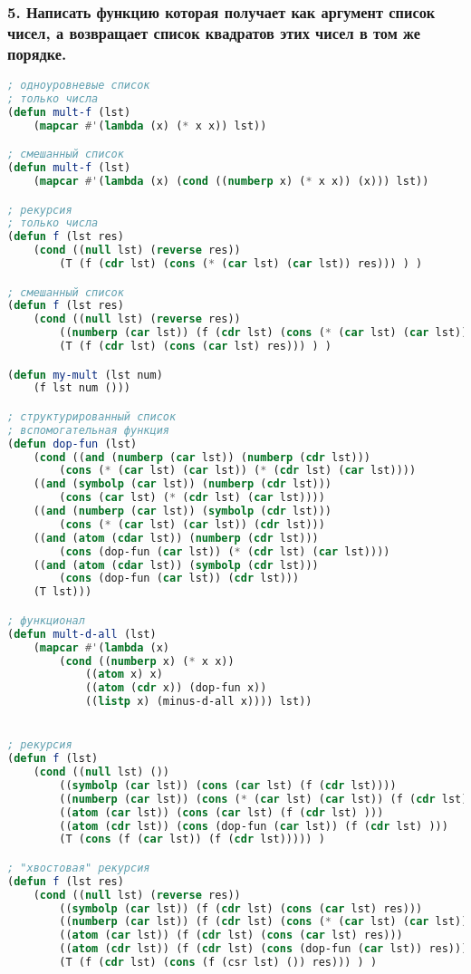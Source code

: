 \subsubsection*{5. Написать функцию которая получает как аргумент список чисел, а возвращает список квадратов этих чисел в том же порядке.}
\begin{lstlisting}[language=Lisp]
; одноуровневые список
; только числа
(defun mult-f (lst)
	(mapcar #'(lambda (x) (* x x)) lst))

; смешанный список
(defun mult-f (lst)
	(mapcar #'(lambda (x) (cond ((numberp x) (* x x)) (x))) lst))

; рекурсия
; только числа
(defun f (lst res)
	(cond ((null lst) (reverse res))
		(T (f (cdr lst) (cons (* (car lst) (car lst)) res))) ) )

; смешанный список
(defun f (lst res)
	(cond ((null lst) (reverse res))
		((numberp (car lst)) (f (cdr lst) (cons (* (car lst) (car lst)) res)))
		(T (f (cdr lst) (cons (car lst) res))) ) )

(defun my-mult (lst num)
	(f lst num ()))

; структурированный список
; вспомогательная функция
(defun dop-fun (lst)
	(cond ((and (numberp (car lst)) (numberp (cdr lst))) 
		(cons (* (car lst) (car lst)) (* (cdr lst) (car lst))))
	((and (symbolp (car lst)) (numberp (cdr lst))) 
		(cons (car lst) (* (cdr lst) (car lst))))
	((and (numberp (car lst)) (symbolp (cdr lst))) 
		(cons (* (car lst) (car lst)) (cdr lst)))
	((and (atom (cdar lst)) (numberp (cdr lst))) 
		(cons (dop-fun (car lst)) (* (cdr lst) (car lst))))
	((and (atom (cdar lst)) (symbolp (cdr lst))) 
		(cons (dop-fun (car lst)) (cdr lst)))
	(T lst)))

; функционал
(defun mult-d-all (lst)
	(mapcar #'(lambda (x) 
		(cond ((numberp x) (* x x))
			((atom x) x)
			((atom (cdr x)) (dop-fun x))
			((listp x) (minus-d-all x)))) lst))


; рекурсия
(defun f (lst)
	(cond ((null lst) ())
		((symbolp (car lst)) (cons (car lst) (f (cdr lst))))
		((numberp (car lst)) (cons (* (car lst) (car lst)) (f (cdr lst))))
		((atom (car lst)) (cons (car lst) (f (cdr lst) )))
		((atom (cdr lst)) (cons (dop-fun (car lst)) (f (cdr lst) )))
		(T (cons (f (car lst)) (f (cdr lst))))) )

; "хвостовая" рекурсия
(defun f (lst res)
	(cond ((null lst) (reverse res))
		((symbolp (car lst)) (f (cdr lst) (cons (car lst) res)))
		((numberp (car lst)) (f (cdr lst) (cons (* (car lst) (car lst)) res)))
		((atom (car lst)) (f (cdr lst) (cons (car lst) res)))
		((atom (cdr lst)) (f (cdr lst) (cons (dop-fun (car lst)) res)))
		(T (f (cdr lst) (cons (f (csr lst) ()) res))) ) )

\end{lstlisting}

